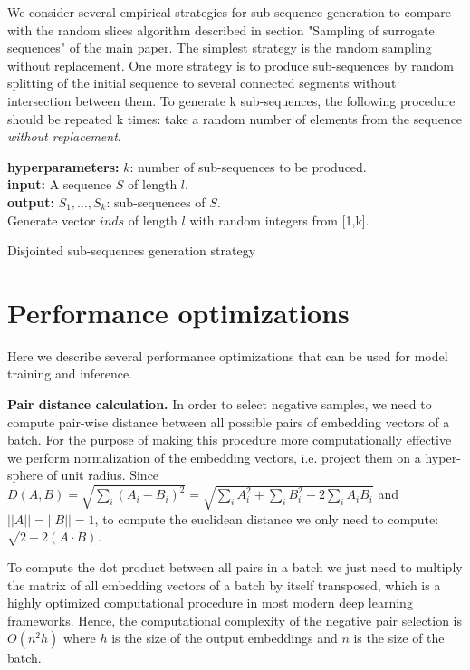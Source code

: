\documentclass{article}
\begin{document}
We consider several empirical strategies for sub-sequence generation to compare with the random slices algorithm described in section "Sampling of surrogate sequences" of the main paper.
The simplest strategy is the random sampling without replacement.
One more strategy is to produce sub-sequences by random splitting of the initial sequence to several connected segments without intersection between them. To generate k sub-sequences, the following procedure should be repeated k times: take a random number of elements from the sequence \textit{without replacement}.

\begin{algorithm}
\SetAlgoLined
\textbf{hyperparameters:} $k$: number of sub-sequences to be produced. \\
\textbf{input:} A sequence $S$ of length $l$. \\
\textbf{output:} $S_1,...,S_k$: sub-sequences of $S$. \\

\BlankLine
Generate vector $inds$ of length $l$ with random integers from [1,k].\\
\caption{Disjointed sub-sequences generation strategy}
\label{alg-disj-ss}

\end{algorithm}

\section{Performance optimizations} \label{app-sec-perf-opt}

Here we describe several performance optimizations that can be used for model training and inference.

\textbf{Pair distance calculation.} In order to select negative samples, we need to compute pair-wise distance between all possible pairs of embedding vectors of a batch. For the purpose of making this procedure more computationally effective we perform normalization of the embedding vectors, i.e. project them on a hyper-sphere of unit radius. Since $D(A,B) = \sqrt{\sum_i(A_i - B_i)^2} = \sqrt{\sum_i A_i^2 + \sum_i B_i^2 - 2\sum_i A_i B_i} $ and $||A||= ||B||=1$, to compute the euclidean distance we only need to compute: $\sqrt{2 - 2(A \cdot B)}$.

To compute the dot product between all pairs in a batch we just need to multiply the matrix of all embedding vectors of a batch by itself transposed, which is a highly optimized computational procedure in most modern deep learning frameworks. Hence, the computational complexity of the negative pair selection is $O(n^2h)$ where $h$ is the size of the output embeddings and $n$ is the size of the batch.
\end{document}
